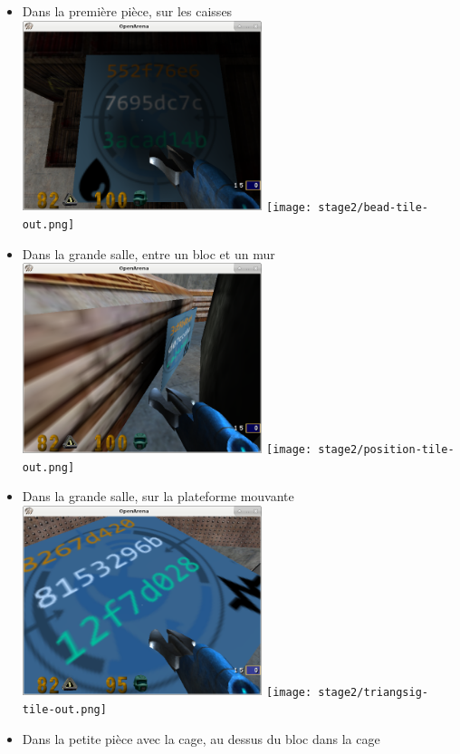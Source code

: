 \documentclass[a4paper,10pt]{article}
\begin{document}
\begin{itemize}
  \item Dans la première pièce, sur les caisses\\
    \includegraphics[width=7cm]{stage2/oashot-bead.png}
    \texttt{[image: stage2/bead-tile-out.png]}
  \item Dans la grande salle, entre un bloc et un mur\\
    \includegraphics[width=7cm]{stage2/oashot-position.png}
    \texttt{[image: stage2/position-tile-out.png]}
  \item Dans la grande salle, sur la plateforme mouvante\\
    \includegraphics[width=7cm]{stage2/oashot-triangsig.png}
    \texttt{[image: stage2/triangsig-tile-out.png]}
  \item Dans la petite pièce avec la cage, au dessus du bloc dans la cage\\

\end{itemize}
\end{document}
